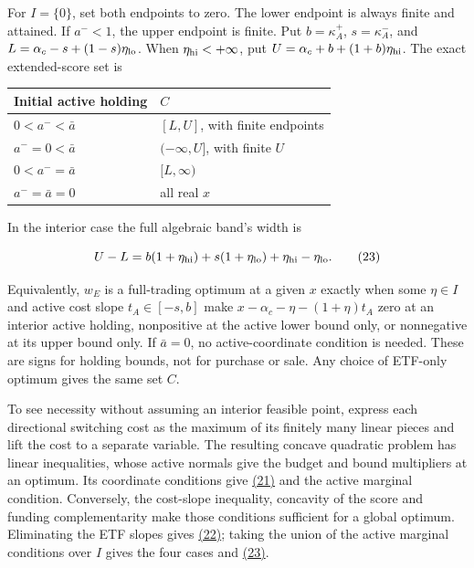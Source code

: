 \documentclass[11pt]{article}
\begin{document}
For \(I=\{0\}\), set both endpoints to zero. The lower endpoint is
always finite and attained. If \(a^-<1\), the upper endpoint is finite.
Put \(b=\kappa_A^+\), \(s=\kappa_A^-\), and
\(L=\alpha_c-s+(1-s)\eta_{\rm lo}\). When
\(\eta_{\rm hi}<+\infty\), put
\(U=\alpha_c+b+(1+b)\eta_{\rm hi}\). The exact extended-score set is

{
\begin{longtable}{ll}
\toprule
\textbf{Initial active holding} & \textbf{\(C\)} \\
\midrule
\endhead
\bottomrule
\endlastfoot
\(0<a^-<\bar a\) & \([L,U]\), with finite endpoints \\
\(a^-=0<\bar a\) & \((-\infty,U]\), with finite \(U\) \\
\(0<a^-=\bar a\) & \([L,\infty)\) \\
\(a^-=\bar a=0\) & all real \(x\) \\
\end{longtable}}

In the interior case the full algebraic band's width is

\begin{equation*}
U-L=b(1+\eta_{\rm hi})+s(1+\eta_{\rm lo})
       +\eta_{\rm hi}-\eta_{\rm lo}.\tag{23}\label{eq:23}
\end{equation*}

Equivalently, \(w_E\) is a full-trading optimum at a given \(x\)
exactly when some \(\eta\in I\) and active cost slope
\(t_A\in[-s,b]\) make
\(x-\alpha_c-\eta-(1+\eta)t_A\) zero at an interior active holding,
nonpositive at the active lower bound only, or nonnegative at its
upper bound only. If \(\bar a=0\), no active-coordinate condition is
needed. These are signs for holding bounds, not for purchase or sale.
Any choice of ETF-only optimum gives the same set \(C\).

To see necessity without assuming an interior feasible point, express
each directional switching cost as the maximum of its finitely many
linear pieces and lift the cost to a separate variable. The resulting
concave quadratic problem has linear inequalities, whose active
normals give the budget and bound multipliers at an optimum. Its
coordinate conditions give \hyperref[eq:21]{(21)} and the active marginal condition.
Conversely, the cost-slope inequality, concavity of the score and
funding complementarity make those conditions sufficient for a global
optimum. Eliminating the ETF slopes gives \hyperref[eq:22]{(22)}; taking the union of
the active marginal conditions over \(I\) gives the four cases and
\hyperref[eq:23]{(23)}.
\end{document}
